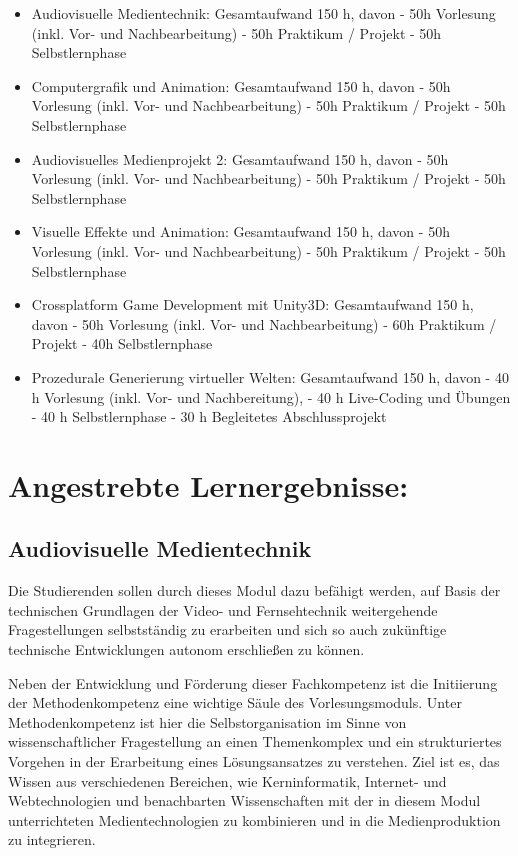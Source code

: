 \begin{itemize}
\tightlist
\item
  Audiovisuelle Medientechnik: Gesamtaufwand 150 h, davon - 50h
  Vorlesung (inkl. Vor- und Nachbearbeitung) - 50h Praktikum / Projekt -
  50h Selbstlernphase
\item
  Computergrafik und Animation: Gesamtaufwand 150 h, davon - 50h
  Vorlesung (inkl. Vor- und Nachbearbeitung) - 50h Praktikum / Projekt -
  50h Selbstlernphase
\item
  Audiovisuelles Medienprojekt 2: Gesamtaufwand 150 h, davon - 50h
  Vorlesung (inkl. Vor- und Nachbearbeitung) - 50h Praktikum / Projekt -
  50h Selbstlernphase
\item
  Visuelle Effekte und Animation: Gesamtaufwand 150 h, davon - 50h
  Vorlesung (inkl. Vor- und Nachbearbeitung) - 50h Praktikum / Projekt -
  50h Selbstlernphase
\item
  Crossplatform Game Development mit Unity3D: Gesamtaufwand 150 h, davon
  - 50h Vorlesung (inkl. Vor- und Nachbearbeitung) - 60h Praktikum /
  Projekt - 40h Selbstlernphase
\item
  Prozedurale Generierung virtueller Welten: Gesamtaufwand 150 h, davon
  - 40 h Vorlesung (inkl. Vor- und Nachbereitung), - 40 h Live-Coding
  und Übungen - 40 h Selbstlernphase - 30 h Begleitetes Abschlussprojekt
\end{itemize}

\section*{Angestrebte
Lernergebnisse:}\label{angestrebte-lernergebnisse-25}

\subsection*{Audiovisuelle
Medientechnik}\label{audiovisuelle-medientechnik}

Die Studierenden sollen durch dieses Modul dazu befähigt werden, auf
Basis der technischen Grundlagen der Video- und Fernsehtechnik
weitergehende Fragestellungen selbstständig zu erarbeiten und sich so
auch zukünftige technische Entwicklungen autonom erschließen zu können.

Neben der Entwicklung und Förderung dieser Fachkompetenz ist die
Initiierung der Methodenkompetenz eine wichtige Säule des
Vorlesungsmoduls. Unter Methodenkompetenz ist hier die
Selbstorganisation im Sinne von wissenschaftlicher Fragestellung an
einen Themenkomplex und ein strukturiertes Vorgehen in der Erarbeitung
eines Lösungsansatzes zu verstehen. Ziel ist es, das Wissen aus
verschiedenen Bereichen, wie Kerninformatik, Internet- und
Webtechnologien und benachbarten Wissenschaften mit der in diesem Modul
unterrichteten Medientechnologien zu kombinieren und in die
Medienproduktion zu integrieren.

